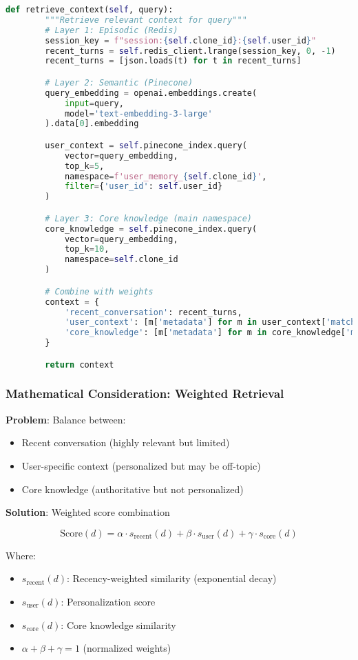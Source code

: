 \documentclass[10pt]{article}
\begin{document}
\begin{lstlisting}[language=Python]
    def retrieve_context(self, query):
        """Retrieve relevant context for query"""
        # Layer 1: Episodic (Redis)
        session_key = f"session:{self.clone_id}:{self.user_id}"
        recent_turns = self.redis_client.lrange(session_key, 0, -1)
        recent_turns = [json.loads(t) for t in recent_turns]

        # Layer 2: Semantic (Pinecone)
        query_embedding = openai.embeddings.create(
            input=query,
            model='text-embedding-3-large'
        ).data[0].embedding

        user_context = self.pinecone_index.query(
            vector=query_embedding,
            top_k=5,
            namespace=f'user_memory_{self.clone_id}',
            filter={'user_id': self.user_id}
        )

        # Layer 3: Core knowledge (main namespace)
        core_knowledge = self.pinecone_index.query(
            vector=query_embedding,
            top_k=10,
            namespace=self.clone_id
        )

        # Combine with weights
        context = {
            'recent_conversation': recent_turns,
            'user_context': [m['metadata'] for m in user_context['matches']],
            'core_knowledge': [m['metadata'] for m in core_knowledge['matches']]
        }

        return context
\end{lstlisting}

\subsubsection{Mathematical Consideration: Weighted Retrieval}

\textbf{Problem}: Balance between:
\begin{itemize}[leftmargin=*]
    \item Recent conversation (highly relevant but limited)
    \item User-specific context (personalized but may be off-topic)
    \item Core knowledge (authoritative but not personalized)
\end{itemize}

\textbf{Solution}: Weighted score combination

\[
\text{Score}(d) = \alpha \cdot s_{\text{recent}}(d) + \beta \cdot s_{\text{user}}(d) + \gamma \cdot s_{\text{core}}(d)
\]

Where:
\begin{itemize}[leftmargin=*]
    \item $s_{\text{recent}}(d)$: Recency-weighted similarity (exponential decay)
    \item $s_{\text{user}}(d)$: Personalization score
    \item $s_{\text{core}}(d)$: Core knowledge similarity
    \item $\alpha + \beta + \gamma = 1$ (normalized weights)
\end{itemize}
\end{document}
